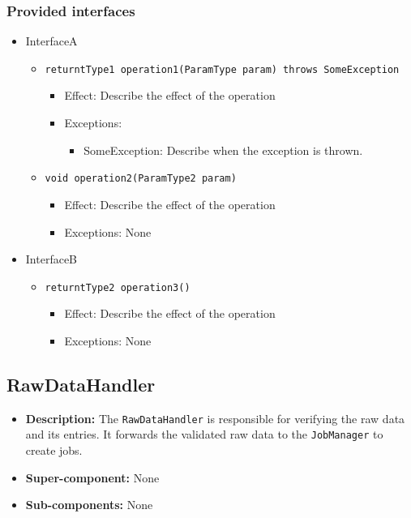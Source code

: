 \documentclass[a4paper,10pt]{article}
\begin{document}
\subsubsection*{Provided interfaces}
\begin{itemize}
    \item InterfaceA
    \begin{itemize}
        \item \texttt{returntType1 operation1(ParamType param) throws SomeException}
        \begin{itemize}
            \item Effect: Describe the effect of the operation
            \item Exceptions:
            \begin{itemize}
                \item SomeException: Describe when the exception is thrown.
            \end{itemize}
		\end{itemize}
		
        \item \texttt{void operation2(ParamType2 param)}
        \begin{itemize}
            \item Effect: Describe the effect of the operation
            \item Exceptions: None
        \end{itemize}
    \end{itemize}

    \item InterfaceB
    \begin{itemize}
        \item \texttt{returntType2 operation3()}
        \begin{itemize}
            \item Effect: Describe the effect of the operation
            \item Exceptions: None
        \end{itemize}
    \end{itemize}
\end{itemize}



\subsection{RawDataHandler}
\begin{itemize}
    \item \textbf{Description:} The \texttt{RawDataHandler} is responsible for verifying the raw data and its entries. It forwards the validated raw data to the \texttt{JobManager} to create jobs.
    \item \textbf{Super-component:} None
    \item \textbf{Sub-components:} None
\end{itemize}
\end{document}
